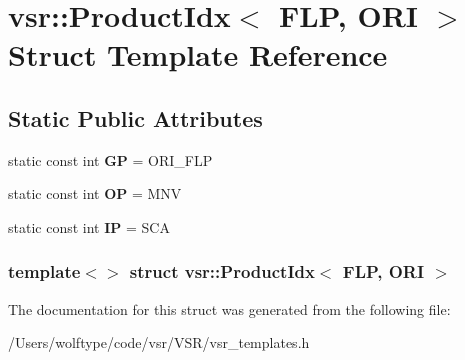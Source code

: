 \hypertarget{structvsr_1_1_product_idx_3_01_f_l_p_00_01_o_r_i_01_4}{\section{vsr\-:\-:Product\-Idx$<$ F\-L\-P, O\-R\-I $>$ Struct Template Reference}
\label{structvsr_1_1_product_idx_3_01_f_l_p_00_01_o_r_i_01_4}
}
\subsection*{Static Public Attributes}
\begin{DoxyCompactItemize}
\item 
\hypertarget{structvsr_1_1_product_idx_3_01_f_l_p_00_01_o_r_i_01_4_a5245f8553a1615eab40c13fb2e3732c1}{static const int {\bfseries G\-P} = O\-R\-I\-\_\-\-F\-L\-P}\label{structvsr_1_1_product_idx_3_01_f_l_p_00_01_o_r_i_01_4_a5245f8553a1615eab40c13fb2e3732c1}

\item 
\hypertarget{structvsr_1_1_product_idx_3_01_f_l_p_00_01_o_r_i_01_4_a670dae32ec15a5b1b75c54f1918d717f}{static const int {\bfseries O\-P} = M\-N\-V}\label{structvsr_1_1_product_idx_3_01_f_l_p_00_01_o_r_i_01_4_a670dae32ec15a5b1b75c54f1918d717f}

\item 
\hypertarget{structvsr_1_1_product_idx_3_01_f_l_p_00_01_o_r_i_01_4_a81a16b4d93b9b733fe3bce0f804644a5}{static const int {\bfseries I\-P} = S\-C\-A}\label{structvsr_1_1_product_idx_3_01_f_l_p_00_01_o_r_i_01_4_a81a16b4d93b9b733fe3bce0f804644a5}

\end{DoxyCompactItemize}
\subsubsection*{template$<$$>$ struct vsr\-::\-Product\-Idx$<$ F\-L\-P, O\-R\-I $>$}



The documentation for this struct was generated from the following file\-:\begin{DoxyCompactItemize}
\item 
/\-Users/wolftype/code/vsr/\-V\-S\-R/vsr\-\_\-templates.\-h\end{DoxyCompactItemize}
